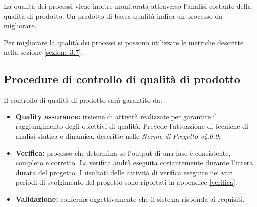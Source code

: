 \noindent La qualità dei processi viene inoltre monitorata attraverso l'analisi costante della qualità di prodotto. Un prodotto di bassa qualità indica un processo da migliorare.

\noindent Per migliorare la qualità dei processi si possono utilizzare le metriche descritte nella sezione \ref{sezione 3.7}.

\subsection{Procedure di controllo di qualità di prodotto}
Il controllo di qualità di prodotto sarà garantito da:
\begin{itemize}
	\item \textbf{Quality assurance:} insieme di attività realizzate per garantire il raggiungimento degli obiettivi di qualità. Prevede l'attuazione di tecniche di analisi statica e dinamica, descritte nelle \textit{Norme di Progetto v4.0.0};
	\item \textbf{Verifica:} processo che determina se l'output di una fase è consistente, completo e corretto. La verifica andrà eseguita costantemente durante l'intera durata del progetto. I risultati delle attività di verifica eseguite nei vari periodi di svolgimento del progetto sono riportati in appendice \ref{verifica}.
	\item \textbf{Validazione:} conferma oggettivamente che il sistema risponda ai requisiti.
\end{itemize}

